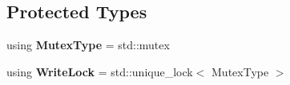 \subsection*{Protected Types}
\begin{DoxyCompactItemize}
\item 
\hypertarget{classBufferingDAG__generic_aee268cc775360e87f89fd05a72f21ec3}{using {\bfseries Mutex\-Type} = std\-::mutex}\label{classBufferingDAG__generic_aee268cc775360e87f89fd05a72f21ec3}

\item 
\hypertarget{classBufferingDAG__generic_af3b29cf93b8f1f13d4c2c5d369daf999}{using {\bfseries Write\-Lock} = std\-::unique\-\_\-lock$<$ Mutex\-Type $>$}\label{classBufferingDAG__generic_af3b29cf93b8f1f13d4c2c5d369daf999}

\end{DoxyCompactItemize}
